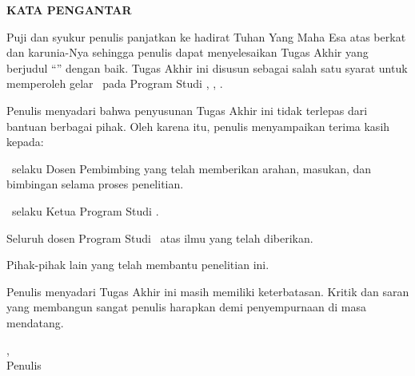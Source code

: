 {}
\begin{center}
    \textbf{\large KATA PENGANTAR}\\[2em]
\end{center}

Puji dan syukur penulis panjatkan ke hadirat Tuhan Yang Maha Esa atas berkat dan
karunia-Nya sehingga penulis dapat menyelesaikan Tugas Akhir yang berjudul
``\judulid'' dengan baik. Tugas Akhir ini disusun sebagai salah satu syarat
untuk memperoleh gelar \gelar\ pada Program Studi \prodi, \fakultas,
\universitas.

Penulis menyadari bahwa penyusunan Tugas Akhir ini tidak terlepas dari bantuan
berbagai pihak. Oleh karena itu, penulis menyampaikan terima kasih kepada:

\begin{daftarnomor}
    \item \pembimbing\ selaku Dosen Pembimbing yang telah memberikan arahan,
          masukan, dan bimbingan selama proses penelitian.
    \item \koorprodi\ selaku Ketua Program Studi \prodi.
    \item Seluruh dosen Program Studi \prodi\ atas ilmu yang telah diberikan.
    \item Pihak-pihak lain yang telah membantu penelitian ini.
\end{daftarnomor}

Penulis menyadari Tugas Akhir ini masih memiliki keterbatasan. Kritik dan saran
yang membangun sangat penulis harapkan demi penyempurnaan di masa mendatang.

\begin{flushright}
    \kota, \tglpengesahan\\[1.5cm]
    Penulis
\end{flushright}
\clearpage
